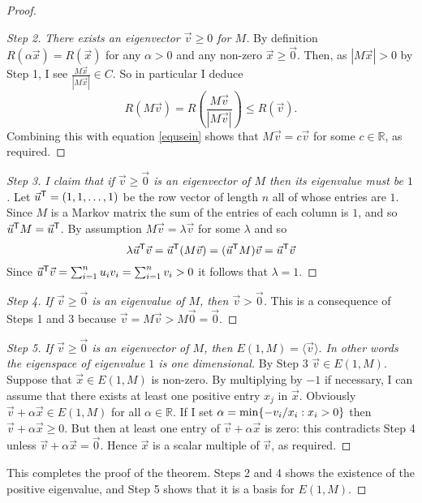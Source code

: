 \documentclass[11pt]{amsbook}
\theoremstyle{definition}
\begin{document}
\begin{proof}
\begin{proof}[Step 2] {\it There exists an eigenvector $\vec{v} \geqslant 0$ for $M$.}
By definition $R( \alpha \vec{x} ) = R(\vec{x})$ for any $\alpha > 0$ and any non-zero $\vec{x}\geqslant \vec{0}$. Then, as $|M\vec{x}| > 0$ by Step 1, I see $\frac{M\vec{x}}{|M\vec{x}|} \in C$. So in particular I deduce $$R(M\vec{v}) = R\left(\frac{M\vec{v}}{|M\vec{v}|}\right) \leqslant R(\vec{v}).$$ Combining this with equation \eqref{equsein} shows that $M\vec{v} = c \vec{v}$ for some $c \in \mathbb{R}$, as required.
\end{proof}

\begin{proof}[Step 3] {\it I claim that if $\vec{v}\geqslant \vec{0}$ is an eigenvector of $M$ then its eigenvalue must be $1$. } Let $\vec{u}^{\sf T} = (1, 1, \ldots , 1)$ be the row vector of length $n$ all of whose entries are $1$. Since $M$ is a Markov matrix the sum of the entries of each column is $1$, and so $\vec{u}^{\sf T} M = \vec{u}^{\sf T}$. By assumption $M \vec{v} = \lambda \vec{v}$ for some $\lambda$ and so $$\lambda \vec{u}^{\sf T}\vec{v} = \vec{u}^{\sf T}(M\vec{v}) = (\vec{u}^{\sf T}M)\vec{v} = \vec{u}^{\sf T}\vec{v}$$ Since $\vec{u}^{\sf T}\vec{v} = \sum_{i=1}^n u_iv_i = \sum_{i=1}^n v_i > 0 $ it follows that $\lambda =1$.
\end{proof}

\begin{proof}[Step 4]{\it If $\vec{v} \geqslant \vec{0}$ is an eigenvalue of $M$, then $\vec{v} > \vec{0}$.}
This is a consequence of Steps 1 and 3 because $\vec{v} = M\vec{v} > M\vec{0} = \vec{0}.$
\end{proof}

\begin{proof}[Step 5] {\it If $\vec{v} \geqslant \vec{0}$ is an eigenvector of $M$, then $E(1, M) = \langle \vec{v} \rangle.$ In other words the eigenspace of eigenvalue $1$ is one dimensional.}
By Step 3 $\vec{v}\in E(1, M)$. Suppose that $\vec{x} \in E(1,M)$ is non-zero. By multiplying by $-1$ if necessary, I can assume that there exists at least one positive entry $x_j$ in $\vec{x}$. Obviously $\vec{v} + \alpha \vec{x} \in E(1,M)$ for all $\alpha \in \mathbb{R}$. If I set $\alpha = {\rm min} \{ -v_i / x_i : x_i >0 \}$ then $\vec{v} + \alpha \vec{x} \geqslant 0$. But then at least one entry of $\vec{v} + \alpha \vec{x}$ is zero: this contradicts Step 4 unless $\vec{v} + \alpha \vec{x} = \vec{0}$. Hence $\vec{x}$ is a scalar multiple of $\vec{v}$, as required.
\end{proof}

This completes the proof of the theorem. Steps 2 and 4 shows the existence of the positive eigenvalue, and Step 5 shows that it is a basis for $E(1,M)$.
\end{proof}
\end{document}

